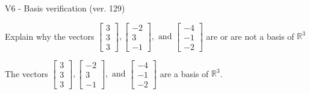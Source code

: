 \begin{exercise}
  \begin{exerciseTitle}V6 - Basis verification (ver. 129)\end{exerciseTitle}
  \begin{exerciseStatement}
    Explain why the vectors \(\left[\begin{array}{r}
3 \\
3 \\
3
\end{array}\right] , \left[\begin{array}{r}
-2 \\
3 \\
-1
\end{array}\right] , \text{ and } \left[\begin{array}{r}
-4 \\
-1 \\
-2
\end{array}\right]\) are or are not a basis of \(\mathbb{R}^3\)	


  \end{exerciseStatement}
  \begin{exerciseAnswer}
   The vectors \(\left[\begin{array}{r}
3 \\
3 \\
3
\end{array}\right] , \left[\begin{array}{r}
-2 \\
3 \\
-1
\end{array}\right] , \text{ and } \left[\begin{array}{r}
-4 \\
-1 \\
-2
\end{array}\right]\) 
  	 are  a basis of \(\mathbb{R}^3\).
  


  \end{exerciseAnswer}
\end{exercise}